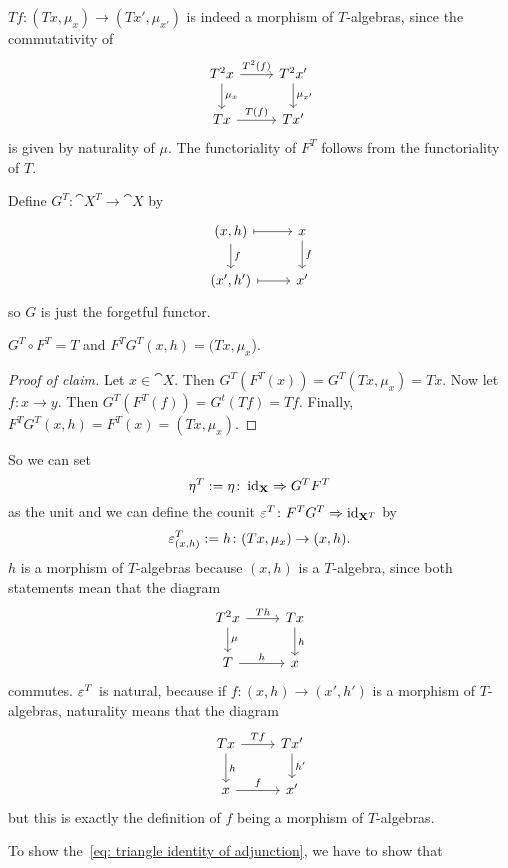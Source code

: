 \begin{beweis}
\begin{itemize1}
$Tf \colon (Tx,\mu_x) \to (Tx',\mu_{x'})$ is indeed a morphism of $T$-algebras,
since the commutativity of 
\[
  \begin{tikzcd}
      T^2x \arrow[r,"T^2(f)"] \arrow[d,"\mu_x"] 
        & T^2x' \arrow[d,"\mu_{x'}"] \\
      Tx \arrow[r,"T(f)"]
        & Tx'
  \end{tikzcd}  
\]
is given by naturality of $\mu$. The functoriality of $F^T$ follows from the functoriality
of $T$.
\item
Define $G^T \colon \cat{X^T} \to \cat{X}$ by
\[
    \begin{tikzcd}
        (x,h) \arrow[r,mapsto] \arrow[d,"f"] 
          & x \arrow[d,"f"] \\
        (x',h') \arrow[r,mapsto]
          & x'
    \end{tikzcd}   
\]
so $G$ is just the forgetful functor.
\begin{claim*}
    $G^T \circ F^T = T$ and $F^TG^T(x,h) = (Tx,\mu_x$).
\end{claim*}
\begin{proof}[Proof of claim]
    Let $x \in \cat{X}.$ Then $G^T(F^T(x)) = G^T(Tx,\mu_x) = Tx.$
    Now let $f \colon x \to y$. Then $G^T(F^T(f))=G^t(Tf)=Tf.$
    Finally, $F^TG^T(x,h) = F^T(x) = (Tx,\mu_x).$
\end{proof}
\item
So we can set 
\[
  \eta^T := \eta \colon \operatorname{id}_{\mathbf{X}} \Rightarrow G^TF^T 
\]
as the unit and we can define the counit $\varepsilon^T \colon F^TG^T \Rightarrow \operatorname{id}_{\mathbf{X}^T}$ by
\[
    \varepsilon^T_{(x,h)} := h \colon (Tx,\mu_x) \to (x,h).
\]
$h$ is a morphism of $T$-algebras because $(x,h)$ is a $T$-algebra, since both statements
mean that the diagram 
\[
    \begin{tikzcd}
        T^2x \arrow[r,"Th"] \arrow[d,"\mu"] 
          & Tx \arrow[d,"h"] \\
        T \arrow[r,"h"]
          & x
    \end{tikzcd}
\]
commutes. $\varepsilon^T$ is natural, because if $f \colon (x,h) \to (x',h')$
is a morphism of $T$-algebras, naturality means that the diagram
\[
    \begin{tikzcd}
        Tx \arrow[r,"Tf"] \arrow[d,"h"]
          & Tx' \arrow[d,"h'"] \\
        x \arrow[r,"f"]
          & x'
    \end{tikzcd}
\]
but this is exactly the definition of $f$ being a morphism of $T$-algebras.
\item To show the~\ref{eq: triangle identity of adjunction}, we have to show that 

\end{itemize1}
\end{beweis}
